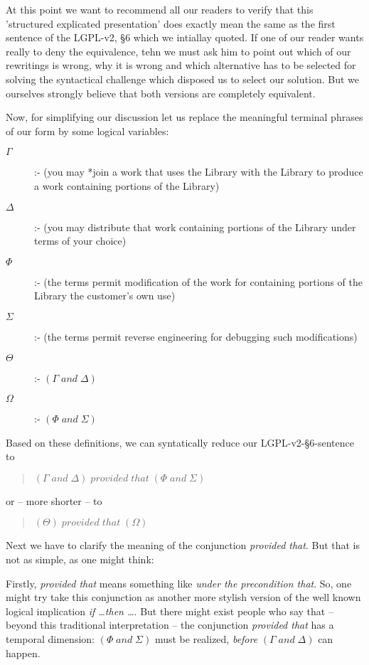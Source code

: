 At this point we want to recommend all our readers to verify that this
'structured explicated presentation' does exactly mean the same as the first
sentence of the LGPL-v2, §6 which we intiallay quoted. If one of our reader
wants really to deny the equivalence, tehn we must ask him to point out which of
our rewritings is wrong, why it is wrong and which alternative has to be
selected for solving the syntactical challenge which disposed us to select our 
solution. But we ourselves strongly believe that both versions are completely
equivalent.

Now, for simplifying our discussion let us replace the meaningful terminal
phrases of our form by some logical variables:

\begin{description}
  \item[$\Gamma$] :- (you may *join a work that uses the Library with the
  Library to produce a work containing portions of the Library)
  \item[$\Delta$] :- (you may distribute that work containing portions of the
  Library under terms of your choice)
  \item[$\Phi$] :- (the terms permit modification of the work for containing
  portions of the Library the customer's own use)
  \item[$\Sigma$] :- (the terms permit reverse engineering for debugging such
  modifications)
  \item[$\Theta$] :- $(\Gamma \; and \; \Delta)$
  \item[$\Omega$] :- $(\Phi \; and \; \Sigma)$
\end{description}

Based on these definitions, we can syntatically reduce our LGPL-v2-§6-sentence
to 

\begin{quote}\noindent $(\Gamma \; and \; \Delta) \; provided \;
that \; (\Phi \; and \; \Sigma)$
\end{quote}

or -- more shorter -- to 

\begin{quote}\noindent $(\Theta) \; provided \; that \; (\Omega)$
\end{quote}

Next we have to clarify the meaning of the conjunction \emph{provided that}.
But that is not as simple, as one might think:

Firstly, \emph{provided that} means something like \emph{under the precondition
that}. So, one might try take this conjunction as another more stylish version
of the well known logical implication \emph{if \ldots then \ldots}. But there
might exist people who say that -- beyond this traditional interpretation -- the
conjunction \emph{provided that} has a temporal dimension: $(\Phi \; and \;
\Sigma)$ must be realized, \emph{before} $(\Gamma \; and \; \Delta)$ can happen.


